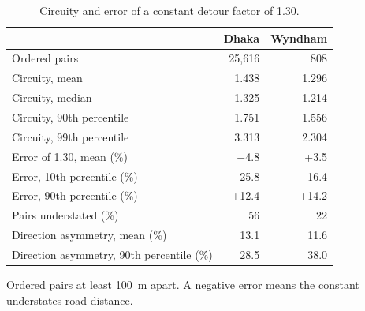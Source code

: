 \begin{table}[!htbp]
\caption{Circuity and error of a constant detour factor of 1.30.}
\label{tab:circuity}
\centering
\small
\begin{tabular}{lrr}
\toprule
 & Dhaka & Wyndham \\
\midrule
Ordered pairs & 25{,}616 & 808 \\
Circuity, mean & 1.438 & 1.296 \\
Circuity, median & 1.325 & 1.214 \\
Circuity, 90th percentile & 1.751 & 1.556 \\
Circuity, 99th percentile & 3.313 & 2.304 \\
\midrule
Error of 1.30, mean (\%) & \ensuremath{-}4.8 & +3.5 \\
Error, 10th percentile (\%) & \ensuremath{-}25.8 & \ensuremath{-}16.4 \\
Error, 90th percentile (\%) & +12.4 & +14.2 \\
Pairs understated (\%) & 56 & 22 \\
\midrule
Direction asymmetry, mean (\%) & 13.1 & 11.6 \\
Direction asymmetry, 90th percentile (\%) & 28.5 & 38.0 \\
\bottomrule
\end{tabular}
\par\smallskip\footnotesize Ordered pairs at least 100~m apart. A negative error means the constant understates road distance.
\end{table}
